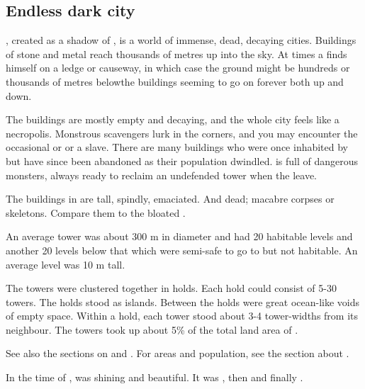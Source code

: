 \subsection{Endless dark city}
\Nyx{}, created as a shadow of \Erebos, is a world of immense, dead, decaying cities. 
Buildings of stone and metal reach thousands of metres up into the sky. 
At times a \traveller finds himself on a ledge or causeway, in which case the ground might be hundreds or thousands of metres below\dash the buildings seeming to go on forever both up and down. 

The buildings are mostly empty and decaying, and the whole city feels like a necropolis. 
Monstrous scavengers lurk in the corners, and you may encounter the occasional \bane{} or \resphan{} or a \human{} slave. 
There are many buildings who were once inhabited by \resphain{} but have since been abandoned as their population dwindled. 
\Nyx{} is full of dangerous monsters, always ready to reclaim an undefended tower when the \resphain{} leave. 

The buildings in \Nyx{} are tall, spindly, emaciated. 
And dead; macabre corpses or skeletons. 
Compare them to the bloated .

An average tower was about 300 m in diameter and had 20 habitable levels and another 20 levels below that which were semi-safe to go to but not habitable.
An average level was 10 m tall. 

The towers were clustered together in holds. 
Each hold could consist of 5-30 towers. 
The holds stood as islands.
Between the holds were great ocean-like voids of empty space. 
Within a hold, each tower stood about 3-4 tower-widths from its neighbour. 
The towers took up about 5\% of the total land area of \Nyx.

See also the sections on  and . 
For areas and population, see the section about .

In the time of \Merkyrah, \Nyx was shining and beautiful. 
It was , then  and finally . 

